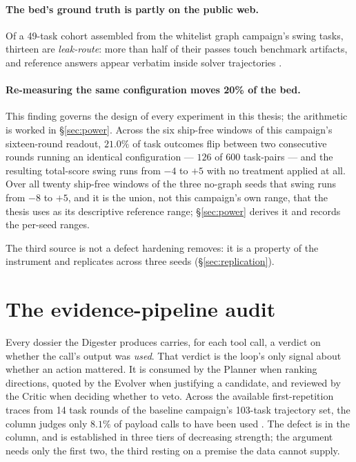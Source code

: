 \paragraph{The bed's ground truth is partly on the public web.} Of a
49-task cohort assembled from the whitelist graph campaign's swing tasks,
thirteen are
\emph{leak-route}: more than half of their passes touch benchmark
artifacts, and reference answers appear verbatim inside solver
trajectories . 

\paragraph{Re-measuring the same configuration moves 20\% of the bed.}
This finding governs the design of every experiment in this thesis; the
arithmetic is worked in \S\ref{sec:power}. Across the six ship-free windows of this
campaign's sixteen-round readout, $21.0\%$ of task outcomes flip between
two consecutive rounds running an identical configuration --- $126$ of
$600$ task-pairs --- and the resulting total-score swing runs from $-4$ to
$+5$ with no treatment applied at all. Over all twenty ship-free windows of
the three no-graph seeds that swing runs from $-8$ to $+5$, and it is the
union, not this campaign's own range, that the thesis uses as its
descriptive reference range; \S\ref{sec:power} derives it and  records the
per-seed ranges.

The third source is not a defect hardening removes: it is a property of
the instrument and replicates across three seeds
(\S\ref{sec:replication}).

\section{The evidence-pipeline audit}
\label{sec:evidence-audit}

Every dossier the Digester produces carries, for each tool call, a verdict
on whether the call's output was \emph{used}. That verdict is the loop's
only signal about whether an action mattered. It is consumed by the
Planner when ranking directions, quoted by the Evolver when justifying a
candidate, and reviewed by the Critic when deciding whether to veto. Across the available first-repetition traces from 14 task rounds of the
baseline campaign's 103-task trajectory set, the column judges only
$8.1\%$ of payload calls to have been used . The defect is in the
column, and is established in three tiers of decreasing strength; the
argument needs only the first two, the third resting on a premise the data
cannot supply.

